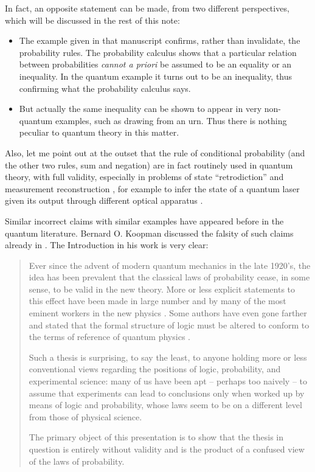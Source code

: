 \documentclass[\ifafour a4paper,12pt,\else a5paper,10pt,\fi%
onecolumn,oneside,article,%
british%
]{memoir}
\theoremstyle{remark}
\theoremstyle{innote}
\renewcommand*{\|}[1][]{\nonscript\,#1\vert\nonscript\;\mathopen{}}
\newcommand*{\sect}{\S}%
\newcommand*{\chaps}{chs}%
\begin{document}
In fact, an opposite statement can be made, from two different
perspectives, which will be discussed in the rest of this note:
\begin{itemize}
\item The example given in that manuscript confirms, rather than
  invalidate, the probability rules. The probability calculus shows that a
  particular relation between probabilities \emph{cannot a priori} be
  assumed to be an equality or an inequality. In the quantum example it
  turns out to be an inequality, thus confirming what the probability
  calculus says.
\item But actually the same inequality can be shown to appear in very
  non-quantum examples, such as drawing from an urn. Thus there is nothing
  peculiar to quantum theory in this matter.
\end{itemize}

Also, let me point out at the outset that the rule of conditional
probability (and the other two rules, sum and negation) are in fact
routinely used in quantum theory, with full validity, especially in
problems of state \enquote{retrodiction} and measurement reconstruction
\parencites{jones1991b,slater1995b}[\chaps~7,8]{demuynck2002b}{barnettetal2003,zimanetal2004_r2006,darianoetal2004}[see][\sect~1
for many further references]{maanssonetal2006}, for example to infer the
state of a quantum laser given its output through different optical
apparatus \parencite{leonhardt1997}.

Similar incorrect claims with similar examples have appeared before in the
quantum literature. Bernard O. Koopman \parencite[of the Pitman-Koopman
theorem for sufficient statistics,][]{koopman1936} discussed the
falsity of such claims already in \cite*{koopman1957}. The Introduction in
his work is very clear:
\begin{quotation}\footnotesize
  Ever since the advent of modern quantum mechanics in the late
  1920's, the idea has been prevalent that the classical laws of
  probability cease, in some sense, to be valid in the new theory. More or
  less explicit statements to this effect have been made in large number
  and by many of the most eminent workers in the new physics \textelp{}.
  Some authors have even gone farther and stated that the formal structure
  of logic must be altered to conform to the terms of reference of quantum
  physics \textelp{}.

  Such a thesis is surprising, to say the least, to anyone holding more or
  less conventional views regarding the positions of logic, probability,
  and experimental science: many of us have been apt -- perhaps too naively
  -- to assume that experiments can lead to conclusions only when worked up
  by means of logic and probability, whose laws seem to be on a different
  level from those of physical science.

  The primary object of this presentation is to show that the thesis in
  question is entirely without validity and is the product of a confused
  view of the laws of probability.
\end{quotation}
\end{document}
